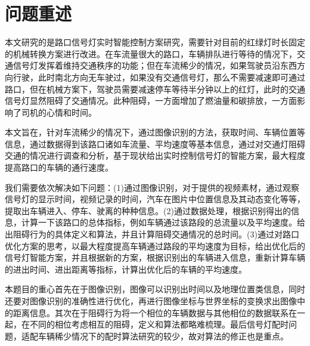 \section{问题重述}\label{sec:peoblem_restatement}

本文研究的是路口信号灯实时智能控制方案研究，需要针对目前的红绿灯时长固定的机械转换方案进行改进。在车流量很大的路口，车辆排队进行等待的情况下，交通信号灯发挥着维持交通秩序的功能；但在车流稀少的情况，如果驾驶员沿东西方向行驶，此时南北方向无车驶过，如果没有交通信号灯，那么不需要减速即可通过路口，但在机械方案下，驾驶员需要减速停车等待半分钟以上的红灯，此时的交通信号灯显然阻碍了交通情况。此种阻碍，一方面增加了燃油量和碳排放，一方面影响了司机的心情和时间。

本文旨在，针对车流稀少的情况下，通过图像识别的方法，获取时间、车辆位置等信息，通过数据得到该路口诸如车流量、平均速度等基本信息，通过对交通灯阻碍交通的情况进行调查和分析，基于现状给出实时控制信号灯的智能方案，最大程度提高路口的车辆的通行速度。

我们需要依次解决如下问题：(1)通过图像识别，对于提供的视频素材，通过观察信号灯的显示时间，视频记录的时间，汽车在图片中位置信息及其动态变化等等，提取出车辆进入、停车、驶离的种种信息。(2)通过数据处理，根据识别得出的信息，计算一下该路口的总体指标，例如车辆通过该路段的总流量以及平均速度。给出阻碍行为的具体定义和算法，并且计算阻碍交通情况的总时间。(3)通过对路口优化方案的思考，以最大程度提高车辆通过路段的平均速度为目标，给出优化后的信号灯智能方案，并且根据新的方案，根据识别出的车辆进入信息，重新计算车辆的进出时间、进出距离等指标，计算出优化后的车辆的平均速度。

本题目的重心首先在于图像识别，图像可以识别出时间以及地理位置类信息，同时还要对图像识别的准确性进行优化，再进行图像坐标与世界坐标的变换求出图像中的距离信息。其次在于阻碍行为将一个相位的车辆数据与其他相位的数据联系在一起，在不同的相位考虑相互的阻碍，定义和算法都略难梳理。最后信号灯配时问题，适配车辆稀少情况下的配时算法研究的较少，故对算法的修正也是重点。
